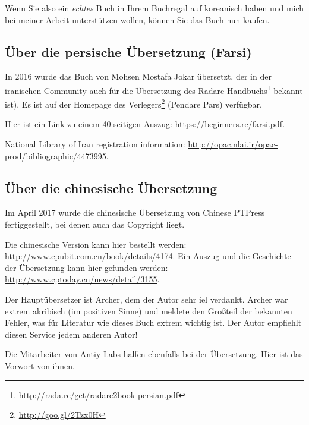 Wenn Sie also ein \emph{echtes} Buch in Ihrem Buchregal auf koreanisch haben und 
mich bei meiner Arbeit unterstützen wollen, können Sie das Buch nun kaufen.

\subsection*{Über die persische Übersetzung (Farsi)}

In 2016 wurde das Buch von Mohsen Mostafa Jokar übersetzt, der in der iranischen Community
auch für die Übersetzung des Radare
Handbuchs\footnote{\url{http://rada.re/get/radare2book-persian.pdf}} bekannt ist).
Es ist auf der Homepage des Verlegers\footnote{\url{http://goo.gl/2Tzx0H}} (Pendare Pars)
verfügbar.

Hier ist ein Link zu einem 40-seitigen Auszug: \url{https://beginners.re/farsi.pdf}.

National Library of Iran registration information: \url{http://opac.nlai.ir/opac-prod/bibliographic/4473995}.

\subsection*{Über die chinesische Übersetzung}

Im April 2017 wurde die chinesische Übersetzung von Chinese PTPress fertiggestellt, bei denen
auch das Copyright liegt.

Die chinesische Version kann hier bestellt werden: \url{http://www.epubit.com.cn/book/details/4174}.
Ein Auszug und die Geschichte der Übersetzung kann hier gefunden werden: \url{http://www.cptoday.cn/news/detail/3155}.

Der Hauptübersetzer ist Archer, dem der Autor sehr iel verdankt.
Archer war extrem akribisch (im positiven Sinne) und meldete
den Großteil der bekannten Fehler, was für Literatur wie dieses Buch extrem wichtig ist.
Der Autor empfiehlt diesen Service jedem anderen Autor!

Die Mitarbeiter von \href{http://www.antiy.net/}{Antiy Labs} halfen ebenfalls bei der Übersetzung.
\href{http://www.epubit.com.cn/book/onlinechapter/51413}{Hier ist das Vorwort} von ihnen.
